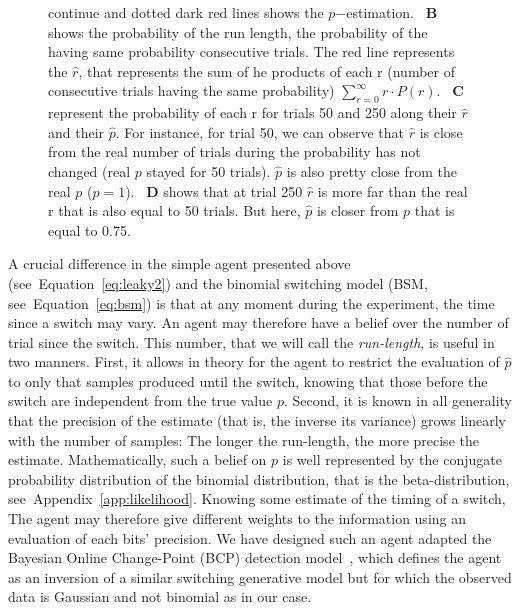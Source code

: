 \documentclass[profile,final,english,draft]{article}%
\newcommand{\citep}[1]{\parencite{#1}}
\newcommand{\seeEq}[1]{Equation~\ref{eq:#1}}
\newcommand{\seeApp}[1]{Appendix~\ref{app:#1}}
\begin{document}
\begin{figure}
{continue and dotted dark red lines shows the $p$$-$estimation.
~\textbf{B} shows the probability of the run length, 
the probability of the having same probability consecutive trials. 
The red line represents the $\hat{r}$, 
that represents the sum of he products of each r
(number of consecutive trials having the same probability)  
$\sum_{r=0}^\infty r \cdot P(r)$.
~\textbf{C} represent the probability of each r for trials 50 and 250 
along their $\hat{r}$ and their $\hat{p}$. 
For instance, for trial 50, we can observe that $\hat{r}$ is close 
from the real number of trials during the probability has not changed (real $p$ stayed for 50 trials). 
$\hat{p}$ is also pretty close from the real $p$ ($p=1$).
~\textbf{D} shows that at trial 250 $\hat{r}$ is more far than the real r 
that is also equal to 50 trials. 
But here, $\hat{p}$ is closer from $p$ that is equal to 0.75.
}
\label{fig:bayesianchangepoint}
\end{figure}
A crucial difference in the simple agent presented above (see~\seeEq{leaky2})
and the binomial switching model (BSM, see~\seeEq{bsm})
is that at any moment during the experiment, the time since a switch may vary.
An agent may therefore have a belief over the number of trial since the switch.
This number, that we will call the \emph{run-length}, is useful in two manners. 
First, it allows in theory for the agent to restrict the evaluation of $\hat{p}$ 
to only that samples produced until the switch,
knowing that those before the switch are independent from the true value $p$.
Second, it is known in all generality that the precision of the estimate  
(that is, the inverse its variance)
grows linearly with the number of samples:
The longer the run-length, the more precise the estimate.
Mathematically, such a belief on $p$ is well represented 
by the conjugate probability distribution of the binomial distribution,
that is the beta-distribution, see~\seeApp{likelihood}.
Knowing some estimate of the timing of a switch,
The agent may therefore give different weights to the information 
using an evaluation of each bits' precision.
We have designed such an agent 
adapted the Bayesian Online Change-Point (BCP) detection model~\citep{AdamsMackay2007},
which defines the agent as an inversion of a similar switching generative model 
but for which the observed data is Gaussian and not binomial as in our case. 
\end{document}
